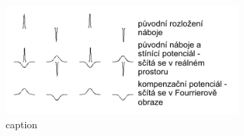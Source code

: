 %
%
%
%
%

\begin{figure}[htb!]
	\centering
	\includegraphics[width=1.0\linewidth]{img/ewald.png} 
	\caption{caption}
	\label{fig:ewald}    
\end{figure} 
